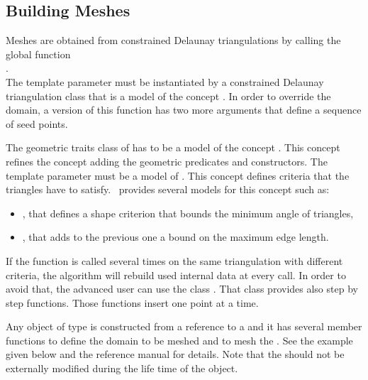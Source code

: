 \subsection{Building Meshes}
\label{sec:Mesh_2_building_meshes}

Meshes are obtained from
constrained Delaunay triangulations by calling the global function \\
. \\
The template parameter  must be instantiated by a constrained
Delaunay triangulation class that is a model of the concept
. In order to override the domain,
a version of this function has two more arguments that define a sequence of
seed points.

The geometric traits class of  has to be a
model of the concept .  This concept
refines the concept 
adding the geometric predicates and constructors. The template parameter
 must be a model of . This concept
defines criteria that the triangles have to satisfy.
\cgal\ provides several models for this concept such as:
\begin{itemize}
\item {}, that defines a shape criterion
  that bounds the minimum angle of triangles, 
\item {}, that adds to the previous one a
  bound on the maximum edge length.
\end{itemize}

If the function  is called several times on the
same triangulation with different criteria, the algorithm will rebuild used
internal data at every call. In order to avoid that, the advanced user can
use the class . That class provides also step
by step functions. Those functions insert one point at a time.

Any object of type  is constructed from a
reference to a  and it has several member functions to define the
domain to be meshed and to mesh the . See the example given below
and the reference manual for details. Note that the  should not be
externally modified during the life time of the 
object.

